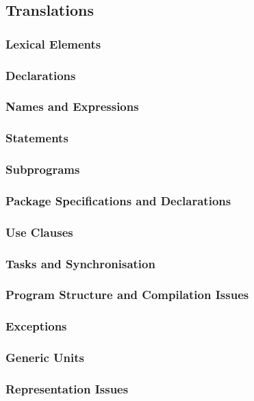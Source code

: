 \documentclass{article}
\begin{document}
\subsection{Translations}

\subsubsection{Lexical Elements}

\subsubsection{Declarations}

\subsubsection{Names and Expressions}

\subsubsection{Statements}


\subsubsection{Subprograms}


\subsubsection{Package Specifications and Declarations}


\subsubsection{Use Clauses}

\subsubsection{Tasks and Synchronisation}

\subsubsection{Program Structure and Compilation Issues}


\subsubsection{Exceptions}

\subsubsection{Generic Units}


\subsubsection{Representation Issues}
\end{document}
